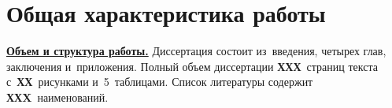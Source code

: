 \section*{Общая характеристика работы}

\newcommand{\actuality}{\pdfbookmark[1]{Актуальность}{actuality}\underline{\textbf{\actualityTXT}}}
\newcommand{\progress}{\pdfbookmark[1]{Разработанность темы}{progress}\underline{\textbf{\progressTXT}}}
\newcommand{\aim}{\pdfbookmark[1]{Цели}{aim}\underline{{\textbf\aimTXT}}}
\newcommand{\correspondence}{\pdfbookmark[1]{Соответствие паспорту специальности}{correspondence}\underline{{\textbf\correspondenceTXT}}}
\newcommand{\tasks}{\pdfbookmark[1]{Задачи}{tasks}\underline{\textbf{\tasksTXT}}}
\newcommand{\aimtasks}{\pdfbookmark[1]{Цели и задачи}{aimtasks}\aimtasksTXT}
\newcommand{\novelty}{\pdfbookmark[1]{Научная новизна}{novelty}\underline{\textbf{\noveltyTXT}}}
\newcommand{\influence}{\pdfbookmark[1]{Научная и практическая значимость}{influence}\underline{\textbf{\influenceTXT}}}
\newcommand{\methods}{\pdfbookmark[1]{Методология и методы исследования}{methods}\underline{\textbf{\methodsTXT}}}
\newcommand{\defpositions}{\pdfbookmark[1]{Положения, выносимые на защиту}{defpositions}\underline{\textbf{\defpositionsTXT}}}
\newcommand{\reliability}{\pdfbookmark[1]{Достоверность}{reliability}\underline{\textbf{\reliabilityTXT}}}
\newcommand{\probation}{\pdfbookmark[1]{Апробация}{probation}\underline{\textbf{\probationTXT}}}
\newcommand{\contribution}{\pdfbookmark[1]{Личный вклад}{contribution}\underline{\textbf{\contributionTXT}}}
\newcommand{\publications}{\pdfbookmark[1]{Публикации}{publications}\underline{\textbf{\publicationsTXT}}}



\underline{\textbf{Объем и структура работы.}} Диссертация состоит из~введения,
четырех глав, заключения и~приложения. Полный объем диссертации
\textbf{ХХХ}~страниц текста с~\textbf{ХХ}~рисунками и~5~таблицами. Список
литературы содержит \textbf{ХХX}~наименований.

